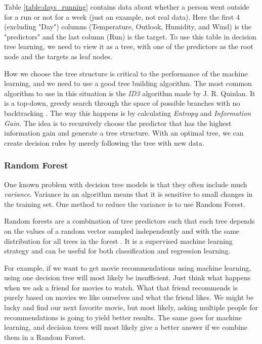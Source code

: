Table \ref{table:days_running} contains data about whether a person went outside for a run or not for a week (just an example, not real data). 
Here the first 4 (excluding "Day") columns (Temperature, Outlook, Humidity, and Wind) is the "predictors" and the last column (Run) is the target. 
To use this table in decision tree learning, we need to view it as a tree, with one of the predictors as the root node and the targets as leaf nodes. 

How we choose the tree structure is critical to the performance of the machine learning, and we need to use a good tree building algorithm. 
The most common algorithm to use in this situation is the \textit{ID3} algorithm made by J. R. Quinlan. It is a top-down, greedy search through the space 
of possible branches with no backtracking \cite{decision_tree}. The way this happens is by calculating \textit{Entropy} and \textit{Information Gain}. 
The idea is to recursively choose the predictor that has the highest information gain and generate a tree structure. With an optimal tree, 
we can create decision rules by merely following the tree with new data.

\subsubsection{Random Forest}
One known problem with decision tree models is that they often include much \textit{variance}. Variance in an algorithm means that it is sensitive to small 
changes in the training set. One method to reduce the variance is to use Random Forest. 

Random forests are a combination of tree predictors such that each tree depends on the values of a
random vector sampled independently and with the same distribution for all trees in the forest \cite{random_forest}. 
It is a supervised machine learning strategy and can be useful for both classification and regression learning.

For example, if we want to get movie recommendations using machine learning, using one decision tree will most likely be insufficient. 
Just think what happens when we ask a friend for movies to watch. What that friend recommends is purely based on movies we like ourselves and what the friend likes. 
We might be lucky and find our next favorite movie, but most likely, asking multiple people for recommendations is going to yield better results. 
The same goes for machine learning, and decision trees will most likely give a better answer if we combine them in a Random Forest.


